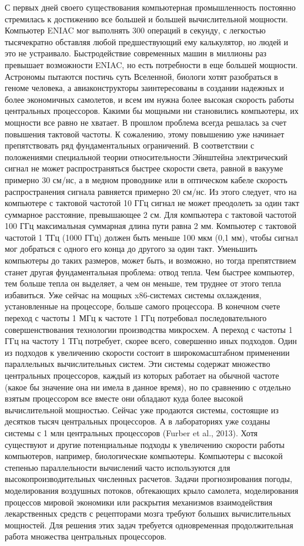 С первых дней своего существования компьютерная промышленность постоянно стремилась к достижению все большей и большей вычислительной мощности. Компьютер ENIAC мог выполнять 300 операций в секунду, с легкостью тысячекратно обставляя любой предшествующий ему калькулятор, но людей и это не устраивало. Быстродействие современных машин в миллионы раз превышает возможности ENIAC, но есть потребности в еще большей мощности. Астрономы пытаются постичь суть Вселенной, биологи хотят разобраться в геноме человека, а авиаконструкторы заинтересованы в создании надежных и более экономичных самолетов, и всем им нужна более высокая скорость работы центральных процессоров. Какими бы мощными ни становились компьютеры, их мощности все равно не хватает. В прошлом проблема всегда решалась за счет повышения тактовой частоты. К сожалению, этому повышению уже начинает препятствовать ряд фундаментальных ограничений. В соответствии с положениями специальной теории относительности Эйнштейна электрический сигнал не может распространяться быстрее скорости света, равной в вакууме примерно 30 см/нс, а в медном проводнике или в оптическом кабеле скорость распространения сигнала равняется примерно 20 см/нс. Из этого следует, что на компьютере с тактовой частотой 10 ГГц сигнал не может преодолеть за один такт суммарное расстояние, превышающее 2 см. Для компьютера с тактовой частотой 100 ГГц максимальная суммарная длина пути равна 2 мм. Компьютер с тактовой частотой 1 ТГц (1000 ГГц) должен быть меньше 100 мкм (0,1 мм), чтобы сигнал мог добраться с одного его конца до другого за один такт. Уменьшить компьютеры до таких размеров, может быть, и возможно, но тогда препятствием станет другая фундаментальная проблема: отвод тепла. Чем быстрее компьютер, тем больше тепла он выделяет, а чем он меньше, тем труднее от этого тепла избавиться. Уже сейчас на мощных x86-системах системы охлаждения, установленные на процессоре, больше самого процессора. В конечном счете переход с частоты 1 МГц к частоте 1 ГГц потребовал последовательного совершенствования технологии производства микросхем. А переход с частоты 1 ГГц на частоту 1 ТГц потребует, скорее всего, совершенно иных подходов. Один из подходов к увеличению скорости состоит в широкомасштабном применении параллельных вычислительных систем. Эти системы содержат множество центральных процессоров, каждый из которых работает на обычной частоте (какое бы значение она ни имела в данное время), но по сравнению с отдельно взятым процессором все вместе они обладают куда более высокой вычислительной мощностью. Сейчас уже продаются системы, состоящие из десятков тысяч центральных процессоров. А в лабораториях уже созданы системы с 1 млн центральных процессоров (Furber et al., 2013). Хотя существуют и другие потенциальные подходы к увеличению скорости работы компьютеров, например, биологические компьютеры. Компьютеры с высокой степенью параллельности вычислений часто используются для высокопроизводительных численных расчетов. Задачи прогнозирования погоды, моделирования воздушных потоков, обтекающих крыло самолета, моделирования процессов мировой экономики или раскрытия механизмов взаимодействия лекарственных средств с рецепторами мозга требуют больших вычислительных мощностей. Для решения этих задач требуется одновременная продолжительная работа множества центральных процессоров. 